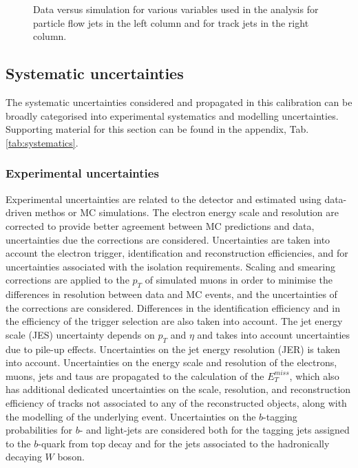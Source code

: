 \documentclass[letterpaper,12pt]{article}
\begin{document}
\begin{figure}%
		\centering
		\\
		\\
		\caption{Data versus simulation for various variables used in the analysis for 
		particle flow jets in the left column and for track jets in the right column.}
		\label{fig:kinematic_distributions_highpT}
\end{figure}
		

\subsection{Systematic uncertainties}

The systematic uncertainties considered and propagated in this calibration 
can be broadly categorised into experimental systematics and modelling uncertainties. 
Supporting material for this section can be found in the appendix, Tab.\ref{tab:systematics}.
\subsubsection{Experimental uncertainties}

Experimental uncertainties are related to the detector and estimated using 
data-driven methos or MC simulations. 
The electron energy scale and resolution are corrected to 
provide better agreement between MC predictions and data, uncertainties 
due the corrections are considered. Uncertainties are taken into account the 
electron trigger, identification and reconstruction efficiencies, and for 
uncertainties associated with the isolation requirements. Scaling and smearing 
corrections are applied to the $p_T$ of simulated muons in order to minimise the differences 
in resolution between data and MC events, and the uncertainties of the corrections are considered. 
Differences in the identification efficiency and in the efficiency of the trigger selection are 
also taken into account. The jet energy scale (JES) uncertainty depends on $p_T$ and $\eta$ and 
takes into account uncertainties due to pile-up effects. Uncertainties on the jet energy resolution (JER) 
is taken into account. Uncertainties on the energy scale and resolution of 
the electrons, muons, jets and taus are propagated to the calculation of the $E_T^{miss}$, 
which also has additional dedicated uncertainties on the scale, resolution, and 
reconstruction efficiency of tracks not associated to any of the reconstructed objects,
 along with the modelling of the underlying event. Uncertainties on the $b$-tagging probabilities 
 for $b$- and light-jets are considered both for the tagging jets assigned to the $b$-quark 
 from top decay and for the jets associated to the hadronically decaying $W$ boson.
\end{document}
